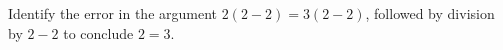 Identify the error in the argument $ 2(2-2)=3(2-2)$, followed by division by $ 2-2 $ to conclude $ 2=3 $.
